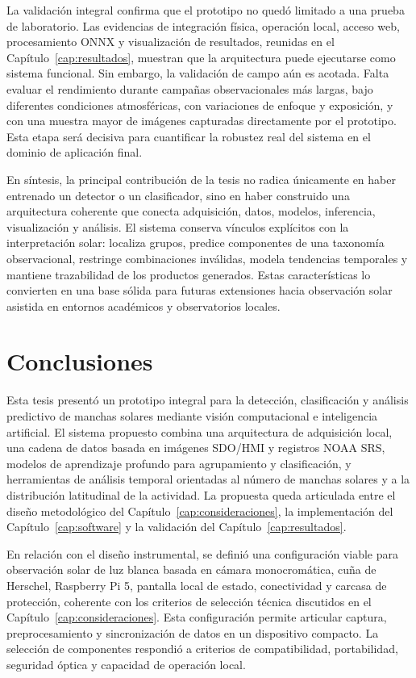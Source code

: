 La validación integral confirma que el prototipo no quedó limitado a una prueba
de laboratorio. Las evidencias de integración física, operación local, acceso web,
procesamiento ONNX y visualización de resultados, reunidas en el
Capítulo~\ref{cap:resultados}, muestran que la arquitectura puede ejecutarse como
sistema funcional. Sin embargo, la validación de campo aún
es acotada. Falta evaluar el rendimiento durante campañas observacionales más
largas, bajo diferentes condiciones atmosféricas, con variaciones de enfoque y
exposición, y con una muestra mayor de imágenes capturadas directamente por el
prototipo. Esta etapa será decisiva para cuantificar la robustez real del sistema
en el dominio de aplicación final.

En síntesis, la principal contribución de la tesis no radica únicamente en haber
entrenado un detector o un clasificador, sino en haber construido una arquitectura
coherente que conecta adquisición, datos, modelos, inferencia, visualización y
análisis. El sistema conserva vínculos explícitos con la interpretación solar:
localiza grupos, predice componentes de una taxonomía observacional, restringe
combinaciones inválidas, modela tendencias temporales y mantiene trazabilidad de
los productos generados. Estas características lo convierten en una base sólida
para futuras extensiones hacia observación solar asistida en entornos académicos
y observatorios locales.

\section{Conclusiones}

\label{sec:conclusion}

Esta tesis presentó un prototipo integral para la detección, clasificación y
análisis predictivo de manchas solares mediante visión computacional e
inteligencia artificial. El sistema propuesto combina una arquitectura de
adquisición local, una cadena de datos basada en imágenes SDO/HMI y registros
NOAA SRS, modelos de aprendizaje profundo para agrupamiento y clasificación, y
herramientas de análisis temporal orientadas al número de manchas solares y a la
distribución latitudinal de la actividad. La propuesta queda articulada entre el
diseño metodológico del Capítulo~\ref{cap:consideraciones}, la implementación del
Capítulo~\ref{cap:software} y la validación del Capítulo~\ref{cap:resultados}.

En relación con el diseño instrumental, se definió una configuración viable para
observación solar de luz blanca basada en cámara monocromática, cuña de Herschel,
Raspberry Pi 5, pantalla local de estado, conectividad y carcasa de protección,
coherente con los criterios de selección técnica discutidos en el
Capítulo~\ref{cap:consideraciones}.
Esta configuración permite articular captura, preprocesamiento y sincronización
de datos en un dispositivo compacto. La selección de componentes respondió a
criterios de compatibilidad, portabilidad, seguridad óptica y capacidad de
operación local.


